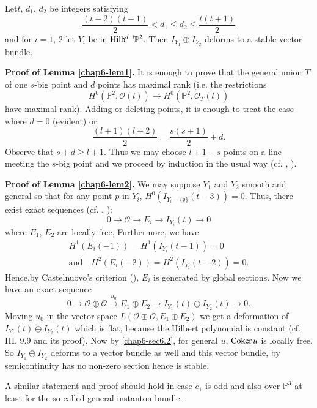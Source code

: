\begin{lemma}\label{chap6-lem2}
Let\pageoriginale $t$, $d_{1}$, $d_{2}$ be integers satisfying
$$
\dfrac{(t-2)(t-1)}{2}<d_{1}\leq d_{2}\leq \dfrac{t(t+1)}{2}
$$
and for $i=1$, $2$ let $Y_{i}$ be in $\operatorname{Hilb}^{d} \
{}^{i}\mathbb{P}^{2}$. Then $I_{Y_{1}}\oplus I_{Y_{2}}$ deforms to a
stable vector bundle. 
\end{lemma}

\noindent
{\bf Proof of Lemma \ref{chap6-lem1}.}
It is enough to prove that the general union $T$ of one $s$-big point
and $d$ points has maximal rank (i.e. the restrictions
$$
H^{0}(\mathbb{P}^{2},\mathscr{O}(l))\to H^{0}(\mathbb{P}^{2},\mathscr{O}_{T}(l))
$$
have maximal rank). Adding or deleting points, it is enough to treat
the case where $d=0$ (evident) or 
$$
\dfrac{(l+1)(l+2)}{2}=\dfrac{s(s+1)}{2}+d.
$$
Observe that $s+d\geq l+1$. Thus we may choose $l+1-s$ points on a
line meeting the $s$-big point and we proceed by induction in the
usual way (cf. \cite{chap6-HH1}, \cite{chap6-Hi}). 

\smallskip
\noindent
{\bf Proof of Lemma \ref{chap6-lem2}.}
We may suppose $Y_{1}$ and $Y_{2}$ smooth and general so that for any
point $p$ in $Y_{i}$,
$H^{0}(I_{Y_{i}-\{\mathfrak{p}\}}(t-3))=0$. Thus, there exist exact
sequences (cf. \cite{chap6-GH1}, \cite{chap6-Bru}):
$$
0\to \mathscr{O}\to E_{i}\to I_{Y_{i}}(t)\to 0
$$
where $E_{1}$, $E_{2}$ are locally free, Furthermore, we have
\begin{gather*}
H^{1}(E_{i}(-1))=H^{1}(I_{Y_{i}}(t-1))=0\\[3pt]
\text{and}\quad H^{2}(E_{i}(-2))=H^{2}(I_{Y_{i}}(t-2))=0. 
\end{gather*}
Hence,\pageoriginale by Castelnuovo's criterion
(\cite[p. 99]{chap6-Mum}), $E_{i}$ is generated by global
sections. Now we have an exact sequence
$$
0\to \mathscr{O}\oplus \mathscr{O}\xrightarrow{u_{0}}E_{1}\oplus
E_{2}\to I_{Y_{1}}(t)\oplus I_{Y_{2}}(t)\to 0.
$$
Moving $u_{0}$ in the vector space
$L(\mathscr{O}\oplus \mathscr{O},E_{1}\oplus E_{2})$ we get a
deformation of $I_{Y_{1}}(t)\oplus I_{Y_{2}}(t)$ which is flat,
because the Hilbert polynomial is constant (cf. \cite{chap6-H1}
III. 9.9 and its proof). Now by \ref{chap6-sec6.2}, for general $u$,
$\operatorname{Coker} u$ is locally free. So $I_{Y_{1}}\oplus I_{Y_{2}}$ deforms to
a vector bundle as well and this vector bundle, by semicontinuity has
no non-zero section hence is stable. 

\begin{remarks*}
A similar statement and proof should hold in case $c_{1}$ is odd and
also over $\mathbb{P}^{3}$ at least for the so-called general
instanton bundle. 
\end{remarks*}

